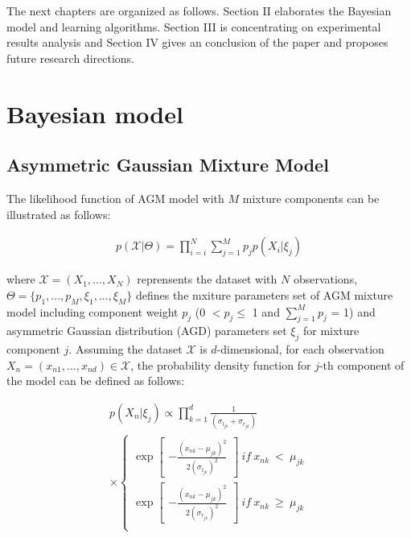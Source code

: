 \documentclass[conference]{IEEEtran}
\begin{document}
The next chapters are organized as follows. Section II elaborates the Bayesian model and learning algorithms. Section III is concentrating on experimental results analysis and Section IV gives an conclusion of the paper and proposes future research directions.


\section{Bayesian model}
\subsection{Asymmetric Gaussian Mixture Model}
The likelihood function of AGM model\cite{Elguebaly2014} with $M$ mixture components can be illustrated as follows:

\begin{align}
p(\mathcal{X}|\Theta) = \prod_{i=i}^N \sum_{j=1}^Mp_jp(X_i|\xi_j)
\label{eq:likelihood}
\end{align}

where $\mathcal{X} = (X_1,...,X_N)$ reprensents the dataset with $N$ observations, $\Theta = \{p_1,...,p_M, \xi_1,...,\xi_M\}$ defines the mxiture parameters set of AGM mixture model including component weight $p_j$ (0 $< p_j \leq$ 1 and $\sum_{j=1}^Mp_j$ = 1) and asymmetric Gaussian distribution (AGD) parameters set $\xi_j$ for mixture component $j$. Assuming the dataset $\mathcal{X}$ is $d$-dimensional, for each observation $X_n = (x_{n1},...,x_{nd})\in\mathcal{X}$, the probability density function\cite{Elguebaly2014} for $j$-th component of the model can be defined as follows:

\begin{multline}
p(X_n|\xi_j) \propto \prod_{k=1}^{d} \frac{1}{(\sigma_{l_{jk}}+\sigma_{r_{jk}})} \\
\times \left\{\begin{matrix}
\exp \begin{bmatrix}
-\frac{(x_{nk}-\mu_{jk})^2}{2(\sigma_{l_{jk}})^2}
\end{bmatrix}\ if\ x_{nk}\ <\ \mu_{jk} \\ 
\exp \begin{bmatrix}
-\frac{(x_{nk}-\mu_{jk})^2}{2(\sigma_{r_{jk}})^2}
\end{bmatrix}\ if\ x_{nk}\ \geqslant\ \mu_{jk} \\ 
\end{matrix}\right.
\label{eq:pdf}
\end{multline}
\end{document}
